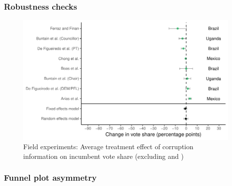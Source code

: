 \documentclass[usenames,dvipsnames]{beamer}
\begin{document}

\begin{frame}[label=supplemental]
\frametitle{Robustness checks}

\begin{figure}[!hb]
\hspace*{-11mm}
\includegraphics[scale = 0.75]{../figs/field_no_banerjee.pdf}
\vspace{-0.2cm}
\caption{Field experiments: Average treatment effect of corruption information on incumbent vote share (excluding \cite{banerjee2010can} and \citet{banerjee2011informed})}
\small
\vspace{-0.5cm}
\label{fig: field_no_banerjee}
\end{figure}
\end{frame}


\begin{frame}[label=funnel]
\frametitle{Funnel plot asymmetry \hyperlink{pub_bias}{}}



\end{frame}

\end{document}
